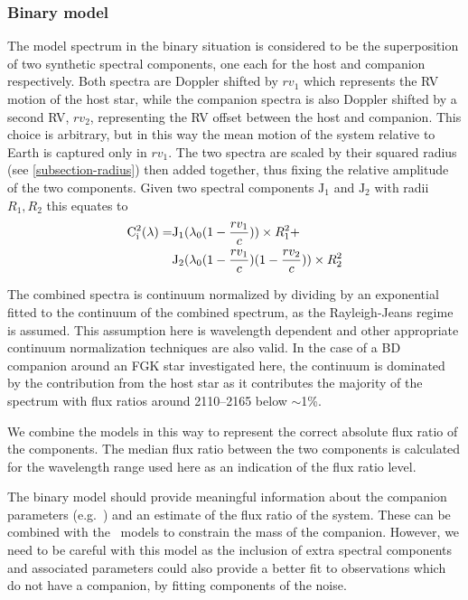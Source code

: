 \subsubsection{Binary model}
\label{subsubsec:binary-model}
The model spectrum in the binary situation is considered to be the superposition of two synthetic spectral components, one each for the host and companion respectively.
Both spectra are Doppler shifted by \({rv}_1\) which represents the {RV} motion of the host star, while the companion spectra is also Doppler shifted by a second {RV}, \({rv}_2\), representing the {RV} offset between the host and companion.
This choice is arbitrary, but in this way the mean motion of the system relative to Earth is captured only in \({rv}_1\).
The two spectra are scaled by their squared radius (see \cref{subsection-radius}) then added together, thus fixing the relative amplitude of the two components.
Given two spectral components \(\textrm{J}_{1}\) and \(\textrm{J}_{2}\) with radii \(R_1, R_2\) this equates to
\begin{align}
\rm C^{2}_{i}(\lambda) = &  \textrm{J}_{1}(\lambda_{0}(1 - \frac{rv_{1}}{c}))\times R_{1}^2 +\nonumber \\
& \textrm{J}_{2}(\lambda_{0}(1-\frac{rv_{1}}{c})(1-\frac{rv_{2}}{c}))\times R_{2}^2
\end{align}


The combined spectra is continuum normalized by dividing by an exponential fitted to the continuum of the combined spectrum, as the Rayleigh-Jeans regime is assumed.
This assumption here is wavelength dependent and other appropriate continuum normalization techniques are also valid.
In the case of a {BD} companion around an FGK star investigated here, the continuum is dominated by the contribution from the host star as it contributes the majority of the spectrum with flux ratios around 2110--2165\nm{} below \(\sim\)1\%.

We combine the models in this way to represent the correct absolute flux ratio of the components.
The median flux ratio between the two components is calculated for the wavelength range used here as an indication of the flux ratio level.

The binary model should provide meaningful information about the companion parameters (e.g.\ \Teff{}) and an estimate of the flux ratio of the system.
These can be combined with the~\citet{baraffe_evolutionary_2003} models to constrain the mass of the companion.
However, we need to be careful with this model as the inclusion of extra spectral components and associated parameters could also provide a better fit to observations which do not have a companion, by fitting components of the noise.\\

